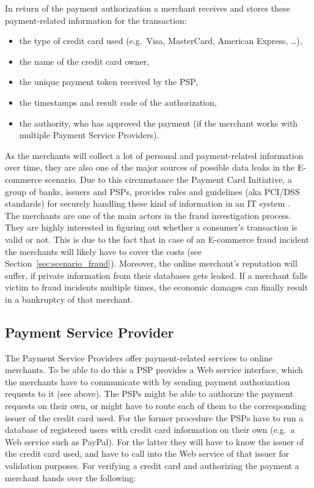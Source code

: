 In return of the payment authorization a merchant receives and stores these  payment-related information for the transaction:\@

\begin{itemize}
		\item the type of credit card used (e.g.\ Visa, MasterCard, American Express, \ldots),
		\item the name of the credit card owner,
		\item the unique payment token received by the \gls{PSP},
		\item the timestamps and result code of the authorization,
		\item the authority, who has approved the payment (if the merchant works with multiple Payment Service Providers).
\end{itemize}

As the merchants will collect a lot of personal and payment-related information over time, they are also one of the major sources of possible data leaks in the \gls{E-commerce} scenario. Due to this circumstance the Payment Card Initiative, a group of banks, issuers and \gls{PSP}s, provides rules and guidelines (aka \gls{PCI/DSS} standards) for securely handling these kind of information in an \gls{IT} system \citep{virtue2009payment}. \\

The merchants are one of the main actors in the fraud investigation process. They are highly interested in figuring out whether a consumer's transaction is valid or not. This is due to the fact that in case of an \gls{E-commerce} fraud incident the merchants will likely have to cover the costs (see Section~\ref{sec:scenario_fraud}). Moreover, the online merchant's reputation will suffer, if private information from their databases gets leaked. If a merchant falls victim to fraud incidents multiple times, the economic damages can finally result in a bankruptcy of that merchant.


\subsection{Payment Service Provider}
\label{subsec:stakeholder_psp}

The Payment Service Providers offer payment-related services to online merchants. To be able to do this a \gls{PSP} provides a Web service interface, which the merchants have to communicate with by sending payment authorization requests to it (see above). The \gls{PSP}s might be able to authorize the payment requests on their own, or might have to route each of them to the corresponding issuer of the credit card used. For the former procedure the \gls{PSP}s have to run a database of registered users with credit card information on their own (e.g.\ a Web service such as PayPal). For the latter they will have to know the issuer of the credit card used, and have to call into the Web service of that issuer for validation purposes. For verifying a credit card and authorizing the payment a merchant hands over the following:\@

